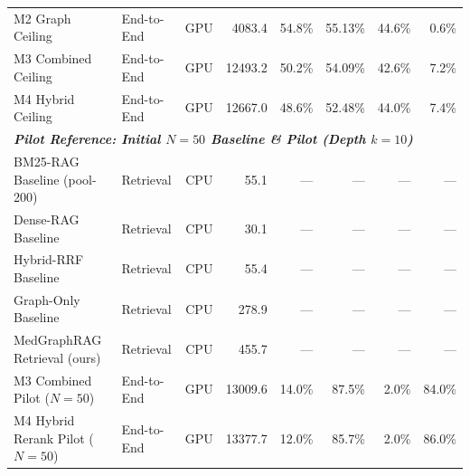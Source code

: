 \begin{table}[t]
\begin{tabular}{l l c r r r r r}
M2 Graph Ceiling & End-to-End & GPU & 4083.4 & 54.8\% & 55.13\% & 44.6\% & 0.6\% \\
M3 Combined Ceiling & End-to-End & GPU & 12493.2 & 50.2\% & 54.09\% & 42.6\% & 7.2\% \\
M4 Hybrid Ceiling & End-to-End & GPU & 12667.0 & 48.6\% & 52.48\% & 44.0\% & 7.4\% \\
\midrule
\multicolumn{8}{l}{\textit{\textbf{Pilot Reference: Initial $N=50$ Baseline \& Pilot (Depth $k=10$)}}} \\
BM25-RAG Baseline (pool-200) & Retrieval & CPU & 55.1 & --- & --- & --- & --- \\
Dense-RAG Baseline & Retrieval & CPU & 30.1 & --- & --- & --- & --- \\
Hybrid-RRF Baseline & Retrieval & CPU & 55.4 & --- & --- & --- & --- \\
Graph-Only Baseline & Retrieval & CPU & 278.9 & --- & --- & --- & --- \\
MedGraphRAG Retrieval (ours) & Retrieval & CPU & 455.7 & --- & --- & --- & --- \\
M3 Combined Pilot ($N=50$) & End-to-End & GPU & 13009.6 & 14.0\% & 87.5\% & 2.0\% & 84.0\% \\
M4 Hybrid Rerank Pilot ($N=50$) & End-to-End & GPU & 13377.7 & 12.0\% & 85.7\% & 2.0\% & 86.0\% \\
\bottomrule
\end{tabular}
\end{table}
